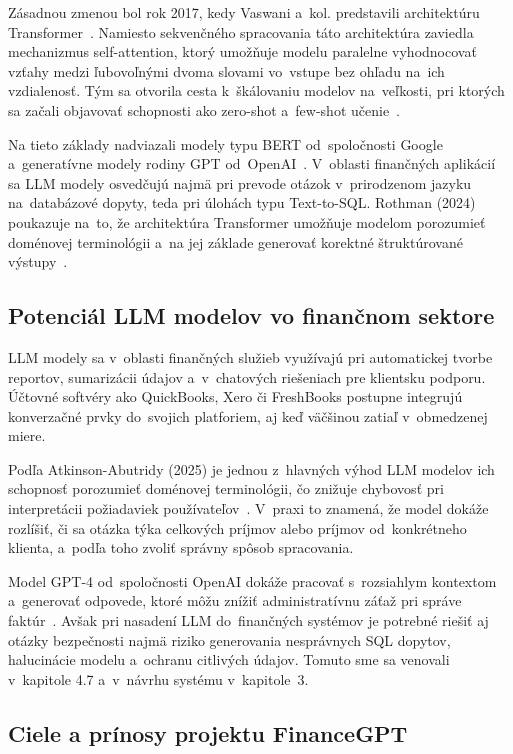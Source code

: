 Zásadnou zmenou bol rok 2017, kedy Vaswani a~kol. predstavili architektúru
Transformer~\cite{vaswani2017}. Namiesto sekvenčného spracovania táto architektúra
zaviedla mechanizmus self-attention, ktorý umožňuje modelu paralelne
vyhodnocovať vzťahy medzi ľubovoľnými dvoma slovami vo~vstupe bez ohľadu na~ich
vzdialenosť. Tým sa otvorila cesta k~škálovaniu modelov na~veľkosti, pri ktorých
sa začali objavovať schopnosti ako zero-shot a~few-shot učenie~\cite{brown2020gpt3,
wei2022cot}.

Na tieto základy nadviazali modely typu BERT od~spoločnosti Google a~generatívne
modely rodiny GPT od~OpenAI~\cite{devlin2019bert, openai2023gpt4}. V~oblasti finančných
aplikácií sa LLM modely osvedčujú najmä pri prevode otázok v~prirodzenom jazyku na~databázové
dopyty, teda pri úlohách typu Text-to-SQL. Rothman (2024) poukazuje na~to, že
architektúra Transformer umožňuje modelom porozumieť doménovej terminológii a~na
jej základe generovať korektné štruktúrované výstupy~\cite{rothman2024transformers}.

\subsection{Potenciál LLM modelov vo finančnom sektore}

LLM modely sa v~oblasti finančných služieb využívajú pri automatickej tvorbe reportov,
sumarizácii údajov a~v~chatových riešeniach pre klientsku podporu. Účtovné softvéry
ako QuickBooks, Xero či FreshBooks postupne integrujú konverzačné prvky do~svojich
platforiem, aj keď väčšinou zatiaľ v~obmedzenej miere.

Podľa Atkinson-Abutridy (2025) je jednou z~hlavných výhod LLM modelov ich schopnosť
porozumieť doménovej terminológii, čo znižuje chybovosť pri interpretácii
požiadaviek používateľov~\cite{atkinson2025}. V~praxi to znamená, že model
dokáže rozlíšiť, či sa otázka  týka celkových príjmov
alebo príjmov od~konkrétneho klienta, a~podľa toho zvoliť správny spôsob spracovania.

Model GPT-4 od~spoločnosti OpenAI dokáže pracovať s~rozsiahlym kontextom a~generovať
odpovede, ktoré môžu znížiť administratívnu záťaž pri správe faktúr~\cite{openai2023gpt4}.
Avšak pri nasadení LLM do~finančných systémov je potrebné riešiť aj otázky bezpečnosti
najmä riziko generovania nesprávnych SQL dopytov, halucinácie modelu a~ochranu
citlivých údajov. Tomuto sme sa venovali v~kapitole 4.7 a~v~návrhu systému v~kapitole~3.

\subsection{Ciele a prínosy projektu FinanceGPT}

